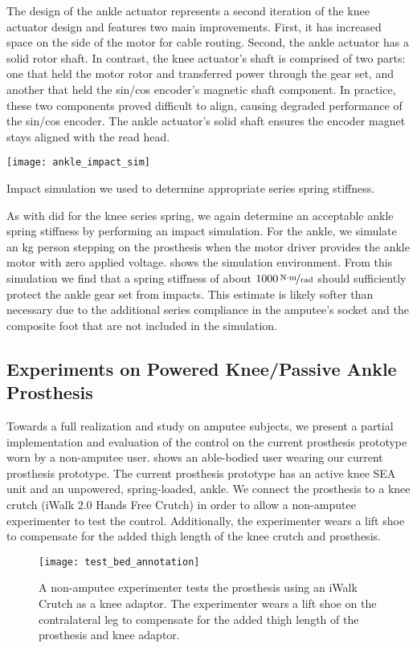 The design of the ankle actuator represents a second iteration of the knee
actuator design and features two main improvements.  First, it has increased
space on the side of the motor for cable routing. Second, the ankle actuator has
a solid rotor shaft. In contrast, the knee actuator's shaft is comprised of two
parts: one that held the motor rotor and transferred power through the gear set,
and another that held the sin/cos encoder's magnetic shaft component. In
practice, these two components proved difficult to align, causing degraded
performance of the sin/cos encoder. The ankle actuator's solid shaft ensures the
encoder magnet stays aligned with the read head.

\begin{marginfigure}[-0.0in]
    \centering 
    \texttt{[image: ankle\_impact\_sim]}
    \caption{Impact simulation we used to determine appropriate series spring
    stiffness.}\label{fig:ankle_impact_sim}
\end{marginfigure}
As with did for the knee series spring, we again determine an acceptable ankle
spring stiffness by performing an impact simulation. For the ankle, we simulate
an \unit[80]{kg} person stepping on the prosthesis when the motor driver
provides the ankle motor with zero applied voltage. 
shows the simulation environment. From this simulation we find that a spring
stiffness of about $\unitfrac[1000]{N \cdot m}{rad}$ should sufficiently protect
the ankle gear set from impacts. This estimate is likely softer than necessary
due to the additional series compliance in the amputee's socket and the
composite foot that are not included in the simulation.

\subsection{Experiments on Powered Knee/Passive Ankle Prosthesis}
Towards a full realization and study on amputee subjects, we present a partial
implementation and evaluation of the control on the current prosthesis prototype
worn by a non-amputee user.  shows an able-bodied
user wearing our current prosthesis prototype. The current prosthesis prototype
has an active knee SEA unit and an unpowered, spring-loaded, ankle.  We connect
the prosthesis to a knee crutch (iWalk 2.0 Hands Free Crutch) in order to allow
a non-amputee experimenter to test the control. Additionally, the experimenter
wears a lift shoe to compensate for the added thigh length of the knee crutch
and prosthesis.
\begin{figure}
    \centering 
    \texttt{[image: test\_bed\_annotation]}
    \caption{A non-amputee experimenter tests the prosthesis using an iWalk
    Crutch as a knee adaptor. The experimenter wears a lift shoe on the
    contralateral leg to compensate for the added thigh length of the prosthesis
    and knee adaptor.
    }\label{fig:test_bed_annotation}
\end{figure}

